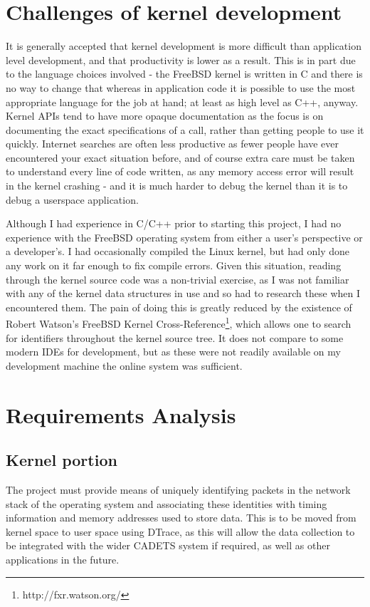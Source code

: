 \documentclass[a4paper,12pt,twoside,openright]{report}
\begin{document}
	\section{Challenges of kernel development}
	
	It is generally accepted that kernel development is more difficult than application level development, and that productivity is lower as a result. This is in part due to the language choices involved - the FreeBSD kernel is written in C and there is no way to change that whereas in application code it is possible to use the most appropriate language for the job at hand; at least as high level as C++, anyway. Kernel APIs tend to have more opaque documentation as the focus is on documenting the exact specifications of a call, rather than getting people to use it quickly. Internet searches are often less productive as fewer people have ever encountered your exact situation before, and of course extra care must be taken to understand every line of code written, as any memory access error will result in the kernel crashing - and it is much harder to debug the kernel than it is to debug a userspace application.
	
	Although I had experience in C/C++ prior to starting this project, I had no experience with the FreeBSD operating system from either a user's perspective or a developer's. I had occasionally compiled the Linux kernel, but had only done any work on it far enough to fix compile errors. Given this situation, reading through the kernel source code was a non-trivial exercise, as I was not familiar with any of the kernel data structures in use and so had to research these when I encountered them. The pain of doing this is greatly reduced by the existence of Robert Watson's FreeBSD Kernel Cross-Reference\footnote{http://fxr.watson.org/}, which allows one to search for identifiers throughout the kernel source tree. It does not compare to some modern IDEs for development, but as these were not readily available on my development machine the online system was sufficient.
	
	\section{Requirements Analysis}
	
	\subsection{Kernel portion}
	
	The project must provide means of uniquely identifying packets in the network stack of the operating system and associating these identities with timing information and memory addresses used to store data. This is to be moved from kernel space to user space using DTrace, as this will allow the data collection to be integrated with the wider CADETS system if required, as well as other applications in the future.
	
\end{document}
